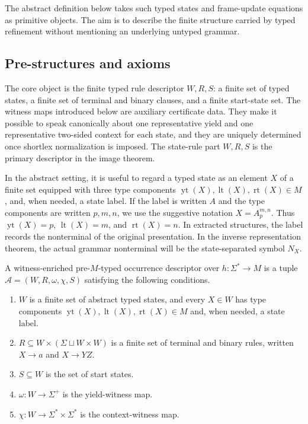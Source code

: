 \documentclass[sub]{jalc}
\newcommand{\yt}{\operatorname{yt}}
\newcommand{\lt}{\operatorname{lt}}
\newcommand{\rt}{\operatorname{rt}}
\newcommand{\A}{\mathcal A}
\begin{document}
The abstract definition below takes such typed states and frame-update equations as primitive objects. The aim is to describe the finite structure carried by typed refinement without mentioning an underlying untyped grammar.

\subsection{Pre-structures and axioms}

The core object is the finite typed rule descriptor \(W,R,S\): a finite set of typed states, a finite set of terminal and binary clauses, and a finite start-state set.  The witness maps introduced below are auxiliary certificate data.  They make it possible to speak canonically about one representative yield and one representative two-sided context for each state, and they are uniquely determined once shortlex normalization is imposed.  The state-rule part \(W,R,S\) is the primary descriptor in the image theorem.

In the abstract setting, it is useful to regard a typed state as an element \(X\) of a finite set equipped with three type components \(\yt(X),\lt(X),\rt(X)\in M\), and, when needed, a state label. If the label is written \(A\) and the type components are written \(p,m,n\), we use the suggestive notation \(X=A_p^{m,n}\). Thus \(\yt(X)=p\), \(\lt(X)=m\), and \(\rt(X)=n\). In extracted structures, the label records the nonterminal of the original presentation. In the inverse representation theorem, the actual grammar nonterminal will be the state-separated symbol \(N_X\).

\begin{definition}
\label{def:pre-structure}
A witness-enriched pre-\(M\)-typed occurrence descriptor over \(h:\Sigma^*\to M\) is a tuple \(\A=(W,R,\omega,\chi,S)\) satisfying the following conditions.
\begin{enumerate}[label=\textup{(\roman*)},leftmargin=2.2em]
\item \(W\) is a finite set of abstract typed states, and every \(X\in W\) has type components \(\yt(X),\lt(X),\rt(X)\in M\) and, when needed, a state label.
\item \(R\subseteq W\times(\Sigma\sqcup W\times W)\) is a finite set of terminal and binary rules, written \(X\to a\) and \(X\to YZ\).
\item \(S\subseteq W\) is the set of start states.
\item \(\omega:W\to\Sigma^+\) is the yield-witness map.
\item \(\chi:W\to\Sigma^*\times\Sigma^*\) is the context-witness map.
\end{enumerate}
\end{definition}
\end{document}
